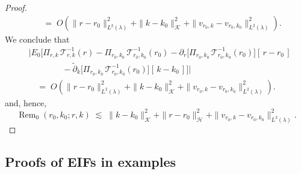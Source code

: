 \documentclass[11pt]{article}
\newcommand{\adk}{\widetilde{\partial}_k}
\theoremstyle{plain}
\begin{document}
\begin{proof}
\begin{align*}
&\;\;=\; O\!\left(\|r-r_0\|_{L^2(\lambda)}^{2} 
+ \|k-k_0\|_{\mathcal K}^{2} 
+ \|v_{r_0,k}-v_{r_0,k_0}\|_{L^2(\lambda)}^{2}\right).
\end{align*}
We conclude that
\begin{align*}
&\Big|E_0\!\Big[\Pi_{r,k}\,\mathcal{T}_{r,k}^{-1}(r) 
- \Pi_{r_0,k_0}\,\mathcal{T}_{r_0,k_0}^{-1}(r_0) 
- \partial_r\!\big[\Pi_{r_0,k_0}\,\mathcal{T}_{r_0,k_0}^{-1}(r_0)\big][\,r-r_0\,] \\
&\qquad\qquad
- \adk\!\big[\Pi_{r_0,k_0}\,\mathcal{T}_{r_0,k_0}^{-1}(r_0)\big][\,k-k_0\,]\Big]\Big| \\
&\quad=\; O\!\left(\|r-r_0\|_{L^2(\lambda)}^{2} 
+ \|k-k_0\|_{\mathcal K}^{2} 
+ \|v_{r_0,k}-v_{r_0,k_0}\|_{L^2(\lambda)}^{2}\right).
\end{align*}
and, hence,
\[
\operatorname{Rem}_0(r_0,k_0; r,k)\;\lesssim\;\|k - k_0\|_{\mathcal{K}}^{2} 
+  \|r - r_0\|_{\mathcal{H}}^{2} 
+ \|v_{r_0,k}-v_{r_0,k_0}\|_{L^2(\lambda)}^{2}.
\]

\end{proof}


 






\subsection{Proofs of EIFs in examples}

 
\label{appendix::eifexproofs}
\end{document}
